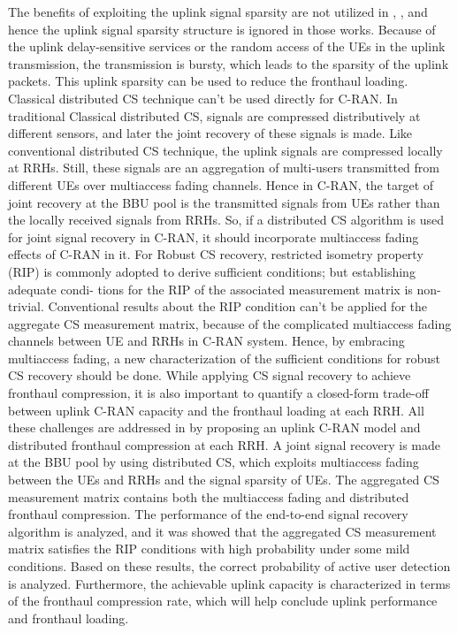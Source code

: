\begin{multicols}{2}
\begin{itemize}
The benefits of exploiting the uplink signal sparsity are not utilized in \cite{art3-key52}, \cite{art3-key53}, and hence the uplink signal sparsity structure is ignored in those works. Because of the uplink delay-sensitive services or the random access of the UEs in the uplink transmission, the transmission is bursty, which leads to the sparsity of the uplink packets. This uplink sparsity can be used to reduce the fronthaul loading. Classical distributed CS technique can’t be used directly for C-RAN. In traditional Classical distributed CS, signals are compressed distributively at different sensors, and later the joint recovery of these signals is made. Like conventional distributed CS technique, the uplink signals are compressed locally at RRHs. Still, these signals are an aggregation of multi-users transmitted from different UEs over multiaccess fading channels. Hence in C-RAN, the target of joint recovery at the BBU pool is the transmitted signals from UEs rather than the locally received signals from RRHs. So, if a distributed CS algorithm is used for joint signal recovery in C-RAN, it should incorporate multiaccess fading effects of C-RAN in it. For Robust CS recovery, restricted isometry property (RIP) is commonly adopted to derive sufficient conditions; but establishing adequate condi- tions for the RIP of the associated measurement matrix is non- trivial. Conventional results about the RIP condition can’t be applied for the aggregate CS measurement matrix, because of the complicated multiaccess fading channels between UE and RRHs in C-RAN system. Hence, by embracing multiaccess fading, a new characterization of the sufficient conditions for robust CS recovery should be done. While applying CS signal recovery to achieve fronthaul compression, it is also important to quantify a closed-form trade-off between uplink C-RAN capacity and the fronthaul loading at each RRH. All these challenges are addressed in \cite{at3-key54} by proposing an uplink C-RAN model and distributed fronthaul compression at each RRH. A joint signal recovery is made at the BBU pool by using distributed CS, which exploits multiaccess fading between the UEs and RRHs and the signal sparsity of UEs. The aggregated CS measurement matrix contains both the multiaccess fading and distributed fronthaul compression. The performance of the end-to-end signal recovery algorithm is analyzed, and it was showed that the aggregated CS measurement matrix satisfies the RIP conditions with high probability under some mild conditions. Based on these results, the correct probability of active user detection is analyzed. Furthermore, the achievable uplink capacity is characterized in terms of the fronthaul compression rate, which will help conclude uplink performance and fronthaul loading. 


\end{itemize}
\end{multicols}
